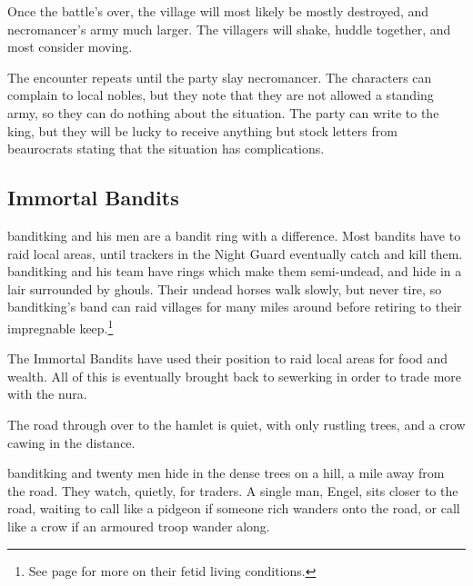 \begin{multicols}{2}
\begin{rollchart}
\end{rollchart}

Once the battle's over, the village will most likely be mostly destroyed, and \gls{necromancer}'s army much larger.  The villagers will shake, huddle together, and most consider moving.

The encounter repeats until the party slay \gls{necromancer}.  The characters can complain to local nobles, but they note that they are not allowed a standing army, so they can do nothing about the situation.  The party can write to the king, but they will be lucky to receive anything but stock letters from beaurocrats stating that the situation has complications.


\ghoul

\subsection{Immortal Bandits}\label{immortalbandits}

\Gls{banditking} and his men are a bandit ring with a difference.
Most bandits have to raid local areas, until trackers in the Night Guard eventually catch and kill them.
\Gls{banditking} and his team have rings which make them semi-undead, and hide in a lair surrounded by ghouls.
Their undead horses walk slowly, but never tire, so \gls{banditking}'s band can raid villages for many miles around before retiring to their impregnable keep.\footnote{See page \pageref{necromancers_lair} for more on their fetid living conditions.}

The Immortal Bandits have used their position to raid local areas for food and wealth.
All of this is eventually brought back to \gls{sewerking} in order to trade more with the nura.


\begin{boxtext}

	The road through over to the hamlet is quiet, with only rustling trees, and a crow cawing in the distance.

\end{boxtext}

\gls{banditking} and twenty men hide in the dense trees on a hill, a mile away from the road.  They watch, quietly, for traders.  A single man, Engel, sits closer to the road, waiting to call like a pidgeon if someone rich wanders onto the road, or call like a crow if an armoured troop wander along.


\end{multicols}
